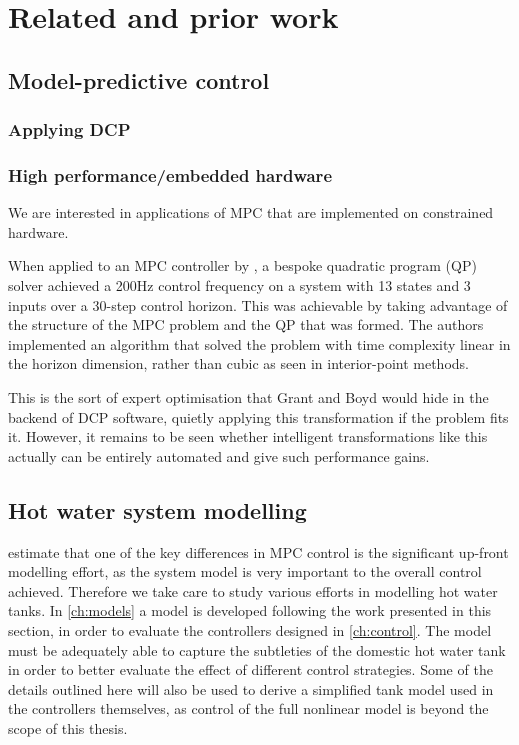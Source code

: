 \chapter{Related and prior work}
\label{ch:review}

\section{Model-predictive control}


\subsection{Applying DCP}


\subsection{High performance/embedded hardware}

We are interested in applications of MPC that are implemented on constrained hardware.

When applied to an MPC controller by \textcite{Wang10}, a bespoke quadratic program (QP) solver achieved a 200Hz control frequency on a system with 13 states and 3 inputs over a 30-step control horizon.
This was achievable by taking advantage of the structure of the MPC problem and the QP that was formed.
The authors implemented an algorithm that solved the problem with time complexity linear in the horizon dimension, rather than cubic as seen in interior-point methods.

This is the sort of expert optimisation that Grant and Boyd would hide in the backend of DCP software, quietly applying this transformation if the problem fits it.
However, it remains to be seen whether intelligent transformations like this actually can be entirely automated and give such performance gains.


\section{Hot water system modelling}

 estimate that one of the key differences in MPC control is the significant up-front modelling effort, as the system model is very important to the overall control achieved.
Therefore we take care to study various efforts in modelling hot water tanks.
In \autoref{ch:models} a model is developed following the work presented in this section, in order to evaluate the controllers designed in \autoref{ch:control}.
The model must be adequately able to capture the subtleties of the domestic hot water tank in order to better evaluate the effect of different control strategies.
Some of the details outlined here will also be used to derive a simplified tank model used in the controllers themselves, as control of the full nonlinear model is beyond the scope of this thesis.

